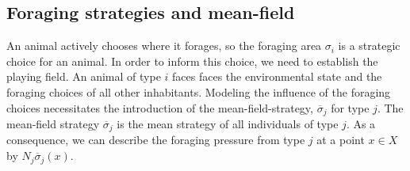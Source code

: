 \subsection{Foraging strategies and mean-field}
An animal actively chooses where it forages, so the foraging area $\sigma_i$ is a strategic choice for an animal. In order to inform this choice, we need to establish the playing field. An animal of type $i$ faces faces the environmental state and the foraging choices of all other inhabitants. Modeling the influence of the foraging choices necessitates the introduction of the mean-field-strategy, $\overbar{\sigma}_j$ for type $j$. The mean-field strategy $\overbar{\sigma}_j$ is the mean strategy of all individuals of type $j$. As a consequence, we can describe the foraging pressure from type $j$ at a point $x\in X$ by $N_j \overbar{\sigma}_j(x)$.


